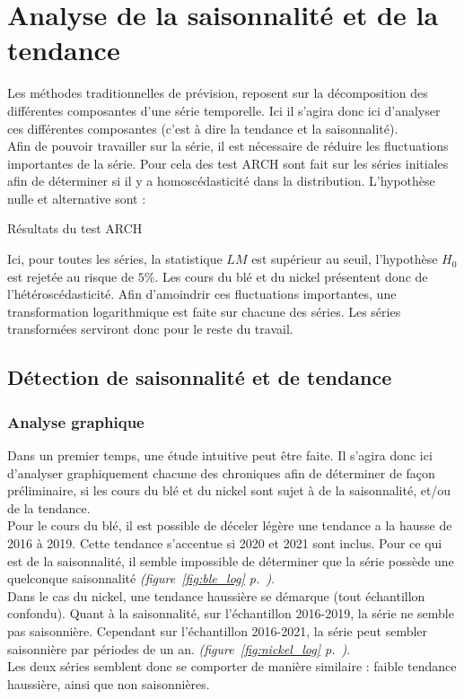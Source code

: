 \section{Analyse de la saisonnalité et de la tendance}
Les méthodes traditionnelles de prévision, reposent sur la décomposition des différentes composantes d'une série temporelle. Ici il s'agira donc
ici d'analyser ces différentes composantes (c'est à dire la tendance et la saisonnalité).\\[11pt]
Afin de pouvoir travailler sur la série, il est nécessaire de réduire les  fluctuations importantes de la série. Pour cela des test ARCH sont fait sur les 
séries initiales afin de déterminer si il y a homoscédasticité dans la distribution. L'hypothèse nulle et alternative sont :
\begin{table}[H]
    \centering
    \caption{Résultats du test ARCH}
    \sffamily
    
\end{table}
Ici, pour toutes les séries, la statistique $LM$ est supérieur au seuil, l'hypothèse $H_{0}$ est  rejetée au risque de $5\%$. Les cours du blé et du nickel
présentent donc de l'hétéroscédasticité. Afin d'amoindrir ces fluctuations importantes, une transformation logarithmique est faite sur chacune des séries. Les séries 
transformées serviront donc pour le reste du travail.
\subsection{Détection de saisonnalité et de tendance}\label{graph}
\subsubsection{Analyse graphique}
Dans un premier temps, une étude intuitive peut être faite. Il s'agira donc ici d'analyser graphiquement chacune des chroniques afin 
de déterminer de façon préliminaire, si les cours du blé et du nickel sont sujet à de la saisonnalité, et/ou de la tendance.\\[11pt]
Pour le cours du blé, il est possible de déceler légère une tendance a la hausse de 2016 à 2019. Cette tendance s'accentue si 2020 et 2021 
sont inclus. Pour ce qui est de la saisonnalité, il semble impossible de déterminer que la série possède une quelconque saisonnalité
\textit{(figure~\ref{fig:ble_log} p.~\pageref{fig:ble_log})}.\\[11pt]
Dans le cas du nickel, une tendance haussière se démarque (tout échantillon confondu). Quant à la saisonnalité, sur l'échantillon 2016-2019, 
la série ne semble pas saisonnière. Cependant sur l'échantillon 2016-2021, la série peut sembler saisonnière par périodes de un an.
\textit{(figure~\ref{fig:nickel_log} p.~\pageref{fig:nickel_log})}.\\[11pt]
Les deux séries semblent donc se comporter de manière similaire : faible tendance haussière, ainsi que non saisonnières. 
